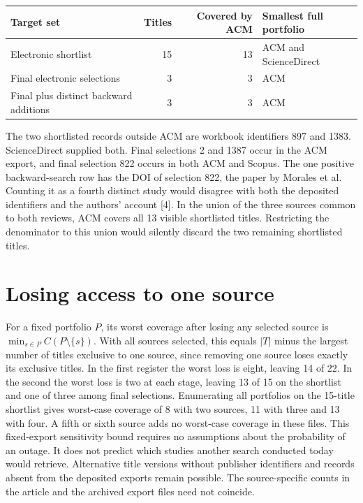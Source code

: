 \documentclass[11pt]{article}
\begin{document}
\newpage
\begin{center}
\begin{tabular}{lrrl}\toprule
Target set & Titles & Covered by ACM & Smallest full portfolio\\\midrule
Electronic shortlist & 15 & 13 & ACM and ScienceDirect\\
Final electronic selections & 3 & 3 & ACM\\
Final plus distinct backward additions & 3 & 3 & ACM\\\bottomrule
\end{tabular}
\end{center}
The two shortlisted records outside ACM are workbook identifiers 897 and 1383. ScienceDirect supplied both. Final selections 2 and 1387 occur in the ACM export, and final selection 822 occurs in both ACM and Scopus. The one positive backward-search row has the DOI of selection 822, the paper by Morales et al. Counting it as a fourth distinct study would disagree with both the deposited identifiers and the authors' account [4]. In the union of the three sources common to both reviews, ACM covers all 13 visible shortlisted titles. Restricting the denominator to this union would silently discard the two remaining shortlisted titles.

\section{Losing access to one source}
For a fixed portfolio $P$, its worst coverage after losing any selected source is $\min_{s\in P} C(P\setminus\{s\})$. With all sources selected, this equals $|T|$ minus the largest number of titles exclusive to one source, since removing one source loses exactly its exclusive titles. In the first register the worst loss is eight, leaving 14 of 22. In the second the worst loss is two at each stage, leaving 13 of 15 on the shortlist and one of three among final selections. Enumerating all portfolios on the 15-title shortlist gives worst-case coverage of 8 with two sources, 11 with three and 13 with four. A fifth or sixth source adds no worst-case coverage in these files. This fixed-export sensitivity bound requires no assumptions about the probability of an outage. It does not predict which studies another search conducted today would retrieve. Alternative title versions without publisher identifiers and records absent from the deposited exports remain possible. The source-specific counts in the article and the archived export files need not coincide.
\end{document}
